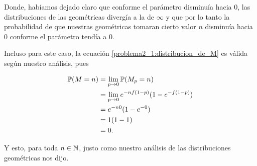 Donde, habíamos dejado claro que conforme el parámetro disminuía hacia 0, las distribuciones de las geométricas divergía 
a la de $\infty$ y que por lo tanto la probabilidad de que nuestras geométricas tomaran cierto 
valor $n$ disminuía hacia $0$ conforme el parámetro tendía a $0$.\pn

Incluso para este caso, la ecuación \eqref{problema2_1:distribucion_de_M} es válida según nuestro análisis, pues

\begin{align}
\mathbb{P}(M = n)  &=  \lim_{p \rightarrow 0} \mathbb{P}(M_p = n)                         \\
                &=  \lim_{p \rightarrow 0} e^{-n f(1-p)}(1-e^{- f(1-p)})    \\
                &=  e^{-n 0}(1-e^{- 0})                                     \\
                &=  1(1-1)                                                  \\
                &=  0.
\end{align}

Y esto, para toda $n \in \mathbb{N}$, justo como nuestro análisis de las distribuciones geométricas
nos dijo.